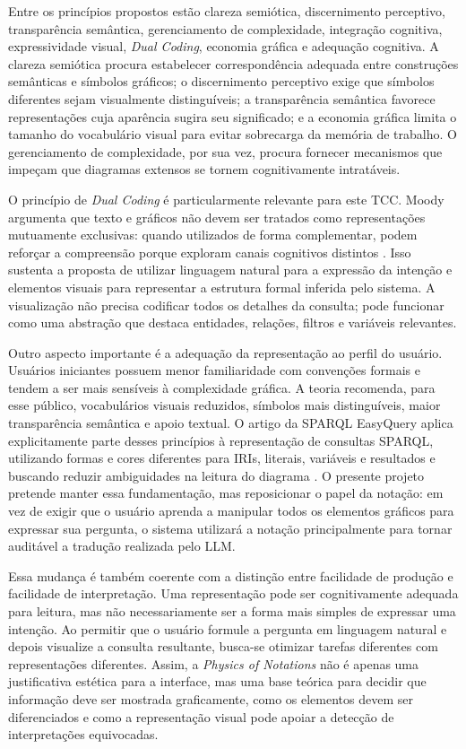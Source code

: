 \documentclass[10pt,a4paper]{article}
\begin{document}
Entre os princípios propostos estão clareza semiótica, discernimento perceptivo, transparência semântica, gerenciamento de complexidade, integração cognitiva, expressividade visual, \textit{Dual Coding}, economia gráfica e adequação cognitiva. A clareza semiótica procura estabelecer correspondência adequada entre construções semânticas e símbolos gráficos; o discernimento perceptivo exige que símbolos diferentes sejam visualmente distinguíveis; a transparência semântica favorece representações cuja aparência sugira seu significado; e a economia gráfica limita o tamanho do vocabulário visual para evitar sobrecarga da memória de trabalho. O gerenciamento de complexidade, por sua vez, procura fornecer mecanismos que impeçam que diagramas extensos se tornem cognitivamente intratáveis.

O princípio de \textit{Dual Coding} é particularmente relevante para este TCC. Moody argumenta que texto e gráficos não devem ser tratados como representações mutuamente exclusivas: quando utilizados de forma complementar, podem reforçar a compreensão porque exploram canais cognitivos distintos \cite{moody2009}. Isso sustenta a proposta de utilizar linguagem natural para a expressão da intenção e elementos visuais para representar a estrutura formal inferida pelo sistema. A visualização não precisa codificar todos os detalhes da consulta; pode funcionar como uma abstração que destaca entidades, relações, filtros e variáveis relevantes.

Outro aspecto importante é a adequação da representação ao perfil do usuário. Usuários iniciantes possuem menor familiaridade com convenções formais e tendem a ser mais sensíveis à complexidade gráfica. A teoria recomenda, para esse público, vocabulários visuais reduzidos, símbolos mais distinguíveis, maior transparência semântica e apoio textual. O artigo da SPARQL EasyQuery aplica explicitamente parte desses princípios à representação de consultas SPARQL, utilizando formas e cores diferentes para IRIs, literais, variáveis e resultados e buscando reduzir ambiguidades na leitura do diagrama \cite{easyquery}. O presente projeto pretende manter essa fundamentação, mas reposicionar o papel da notação: em vez de exigir que o usuário aprenda a manipular todos os elementos gráficos para expressar sua pergunta, o sistema utilizará a notação principalmente para tornar auditável a tradução realizada pelo LLM.

Essa mudança é também coerente com a distinção entre facilidade de produção e facilidade de interpretação. Uma representação pode ser cognitivamente adequada para leitura, mas não necessariamente ser a forma mais simples de expressar uma intenção. Ao permitir que o usuário formule a pergunta em linguagem natural e depois visualize a consulta resultante, busca-se otimizar tarefas diferentes com representações diferentes. Assim, a \textit{Physics of Notations} não é apenas uma justificativa estética para a interface, mas uma base teórica para decidir que informação deve ser mostrada graficamente, como os elementos devem ser diferenciados e como a representação visual pode apoiar a detecção de interpretações equivocadas.
\end{document}

